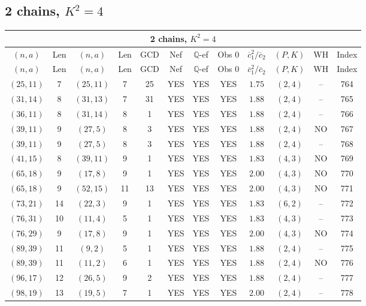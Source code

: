 \subsection{2 chains, $K^2 = 4$}
\begin{longtable}{|c|c|c|c|c|c|c|c|c|c|c|c|}
\hline
\multicolumn{12}{|c|}{2 chains, $K^2 = 4$}\\
\hline
$(n,a)$ & Len & $(n,a)$ & Len & GCD & Nef & $\mathbb Q$-ef & Obs 0 & $\overline c_1^2 / \overline c_2$ & $(P,K)$ & WH & Index\\
\hline
\endfirsthead

\hline
$(n,a)$ & Len & $(n,a)$ & Len & GCD & Nef & $\mathbb Q$-ef & Obs 0 & $\overline c_1^2 / \overline c_2$ & $(P,K)$ & WH & Index\\
\hline
\endhead
\hline
\endfoot

$(25,11)$ & 7 & $(25,11)$ & 7 & 25 & YES & YES & YES & $1.75$ & $(2,4)$ & -- & 764\\
$(31,14)$ & 8 & $(31,13)$ & 7 & 31 & YES & YES & YES & $1.88$ & $(2,4)$ & -- & 765\\
$(36,11)$ & 8 & $(31,14)$ & 8 & 1 & YES & YES & YES & $1.88$ & $(2,4)$ & -- & 766\\
$(39,11)$ & 9 & $(27,5)$ & 8 & 3 & YES & YES & YES & $1.88$ & $(2,4)$ & NO & 767\\
$(39,11)$ & 9 & $(27,5)$ & 8 & 3 & YES & YES & YES & $1.88$ & $(2,4)$ & -- & 768\\
$(41,15)$ & 8 & $(39,11)$ & 9 & 1 & YES & YES & YES & $1.83$ & $(4,3)$ & NO & 769\\
$(65,18)$ & 9 & $(17,8)$ & 9 & 1 & YES & YES & YES & $2.00$ & $(4,3)$ & NO & 770\\
$(65,18)$ & 9 & $(52,15)$ & 11 & 13 & YES & YES & YES & $2.00$ & $(4,3)$ & NO & 771\\
$(73,21)$ & 14 & $(22,3)$ & 9 & 1 & YES & YES & YES & $1.83$ & $(6,2)$ & -- & 772\\
$(76,31)$ & 10 & $(11,4)$ & 5 & 1 & YES & YES & YES & $1.83$ & $(4,3)$ & -- & 773\\
$(76,29)$ & 9 & $(17,8)$ & 9 & 1 & YES & YES & YES & $2.00$ & $(4,3)$ & NO & 774\\
$(89,39)$ & 11 & $(9,2)$ & 5 & 1 & YES & YES & YES & $1.88$ & $(2,4)$ & -- & 775\\
$(89,39)$ & 11 & $(11,2)$ & 6 & 1 & YES & YES & YES & $1.88$ & $(2,4)$ & NO & 776\\
$(96,17)$ & 12 & $(26,5)$ & 9 & 2 & YES & YES & YES & $1.88$ & $(2,4)$ & -- & 777\\
$(98,19)$ & 13 & $(19,5)$ & 7 & 1 & YES & YES & YES & $2.00$ & $(2,4)$ & -- & 778\\

\end{longtable}
